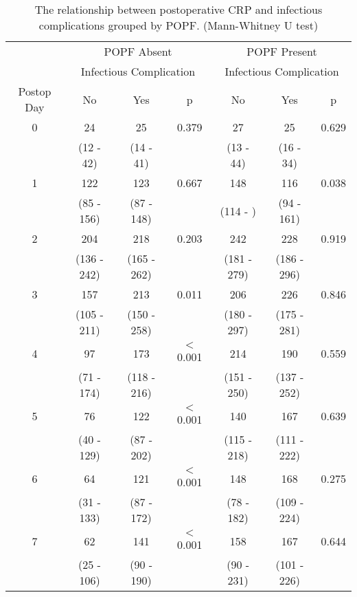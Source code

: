 \begin{table}[h]
	\centering
	\caption{The relationship between postoperative CRP and infectious complications grouped by POPF. (Mann-Whitney U test)}
	\label{table:crp_comp_vs_infections_popf_y1n0}
	\begin{tabular}{| c | c c c | c c c |}
		\hline
		           &       \multicolumn{3}{c}{POPF Absent}       &      \multicolumn{3}{c}{POPF Present}       \\
		           & \multicolumn{3}{c}{Infectious Complication} & \multicolumn{3}{c}{Infectious Complication} \\
		Postop Day & No          & Yes         & p               & No          & Yes         & p               \\ \hline
		0          & 24          & 25          & 0.379           & 27          & 25          & 0.629           \\
		           & (12 - 42)   & (14 - 41)   &                 & (13 - 44)   & (16 - 34)   &  \\
		1          & 122         & 123         & 0.667           & 148         & 116         & 0.038           \\
		           & (85 - 156)  & (87 - 148)  &                 & (114 - )    & (94 - 161)  &  \\
		2          & 204         & 218         & 0.203           & 242         & 228         & 0.919           \\
		           & (136 - 242) & (165 - 262) &                 & (181 - 279) & (186 - 296) &  \\
		3          & 157         & 213         & 0.011           & 206         & 226         & 0.846           \\
		           & (105 - 211) & (150 - 258) &                 & (180 - 297) & (175 - 281) &  \\
		4          & 97          & 173         & $<$0.001        & 214         & 190         & 0.559           \\
		           & (71 - 174)  & (118 - 216) &                 & (151 - 250) & (137 - 252) &  \\
		5          & 76          & 122         & $<$0.001        & 140         & 167         & 0.639           \\
		           & (40 - 129)  & (87 - 202)  &                 & (115 - 218) & (111 - 222) &  \\
		6          & 64          & 121         & $<$0.001        & 148         & 168         & 0.275           \\
		           & (31 - 133)  & (87 - 172)  &                 & (78 - 182)  & (109 - 224) &  \\
		7          & 62          & 141         & $<$0.001        & 158         & 167         & 0.644           \\
		           & (25 - 106)  & (90 - 190)  &                 & (90 - 231)  & (101 - 226) &  \\ \hline
	\end{tabular}
\end{table}